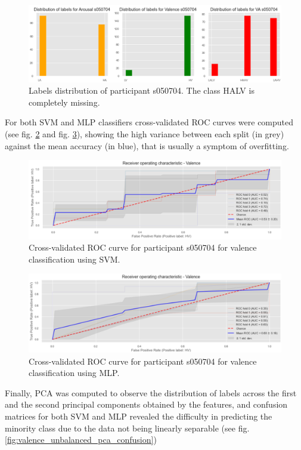 \begin{figure}[!htb]
\includegraphics[width=16cm]{img/appendix/valence_unbalanced_distribution.png}
\centering
\caption{Labels distribution of participant s050704. The class HALV is completely missing.}\label{fig:valence_unbalanced_distribution}
\end{figure}
\FloatBarrier
For both \ac{SVM} and \ac{MLP} classifiers cross-validated ROC curves were computed (see fig. \ref{fig:valence_unbalanced_roc_svm} and fig. \ref{fig:valence_unbalanced_roc_mlp}), showing the high variance between each split (in grey) against the mean accuracy (in blue), that is usually a symptom of overfitting.


\begin{figure}[!htb]
\includegraphics[width=16cm]{img/appendix/valence_unbalanced_roc_svm.png}
\centering
\caption{Cross-validated ROC curve for participant s050704 for valence classification using SVM.}\label{fig:valence_unbalanced_roc_svm}
\end{figure}

\begin{figure}[!htb]
\includegraphics[width=16cm]{img/appendix/valence_unbalanced_roc_mlp.png}
\centering
\caption{Cross-validated ROC curve for participant s050704 for valence classification using MLP.}\label{fig:valence_unbalanced_roc_mlp}
\end{figure}
\FloatBarrier
Finally, \ac{PCA} was computed to observe the distribution of labels across the first and the second principal components obtained by the features, and confusion matrices for both \ac{SVM} and \ac{MLP} revealed the difficulty in predicting the minority class due to the data not being linearly separable (see fig. \ref{fig:valence_unbalanced_pca_confusion})

